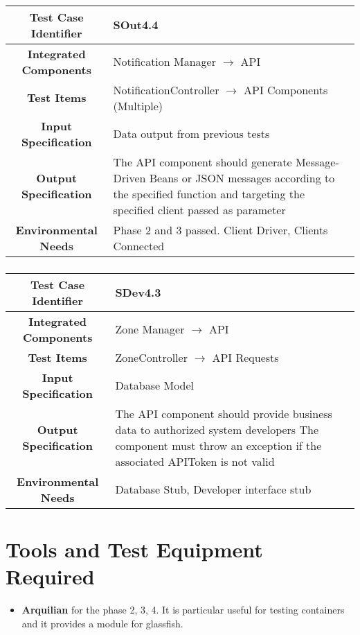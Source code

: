 \documentclass[11pt, a4paper,titlepage]{article}
\begin{document}
			\subsubsection{}
			\begin{tabularx}{\textwidth}{| c|X|}
				\hline \textbf{Test Case Identifier} & \label{SOut4.4 }SOut4.4 \\
				\hline \textbf{Integrated Components} & Notification Manager $\rightarrow $ API \\
				\hline \textbf{Test Items} & NotificationController $\rightarrow $ API Components (Multiple) \\
				\hline \textbf{Input Specification} & Data output from previous tests \\
				\hline \textbf{Output Specification} & The API component should generate Message-Driven Beans or JSON messages according to the specified function and targeting the specified client passed as parameter \\
				\hline \textbf{Environmental Needs} & Phase 2 and 3 passed. Client Driver, Clients Connected \\
				\hline
			\end{tabularx}
			\newline
			\subsubsection{}
			\begin{tabularx}{\textwidth}{| c|X|}
				\hline \textbf{Test Case Identifier} & \label{SDev4.3}SDev4.3 \\
				\hline \textbf{Integrated Components} & Zone Manager $\rightarrow $ API \\
				\hline \textbf{Test Items} & ZoneController $\rightarrow $ API Requests \\
				\hline \textbf{Input Specification} & Database Model \\
				\hline \textbf{Output Specification} & The API component should provide business data to authorized system developers
				\newline The component must throw an exception if the associated APIToken is not valid \\
				\hline \textbf{Environmental Needs} & Database Stub, Developer interface stub \\
				\hline
			\end{tabularx}
			\newline
			
	\newpage
	\section{Tools and Test Equipment Required}
	\begin{itemize}
		\item \textbf{Arquilian} for the phase 2, 3, 4. It is particular useful for testing containers and it provides a module for glassfish.
	\end{itemize}
\end{document}
